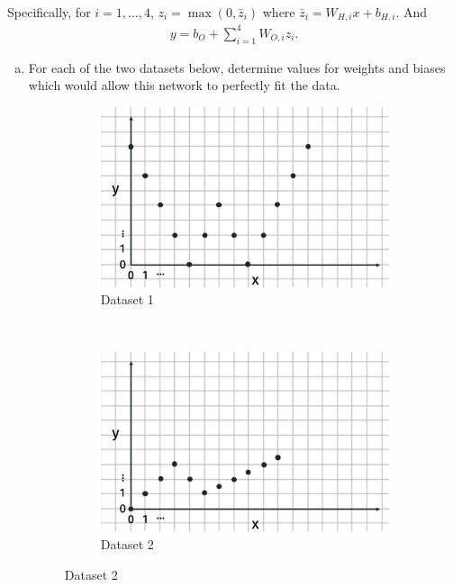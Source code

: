 \documentclass[10pt]{article}
\begin{document}
Specifically, for $i = 1,\ldots, 4$, $z_i = \max(0,\bar{z}_i)$ where $\bar{z}_i = W_{H,i}x + b_{H,i}$. And
\begin{align*}
{y} = b_{O} + \sum_{i=1}^4 W_{O,i}z_i.
\end{align*}
\begin{enumerate}[(a)]
	\item For each of the two datasets below, determine values for weights and biases which would allow this network to perfectly fit the data.
	\captionsetup[subfigure]{labelformat=empty}
	\begin{figure}[h]
		\centering
		\begin{subfigure}{0.45\textwidth}
			\centering
			\includegraphics[width=\textwidth]{data_2.png}
			\caption{Dataset 1}
		\end{subfigure}
	~
		\begin{subfigure}{0.45\textwidth}
			\centering
			\includegraphics[width=\textwidth]{data_1.png}
						\caption{Dataset 2}
		\end{subfigure}
	\end{figure}
	

\end{enumerate}
\end{document}
